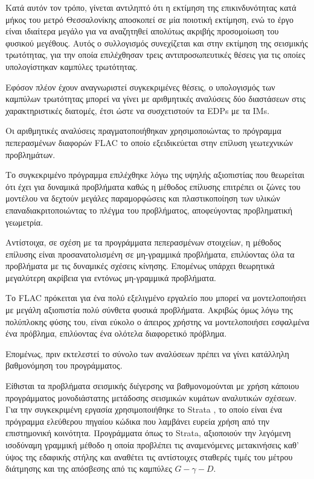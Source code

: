 
Κατά αυτόν τον τρόπο, γίνεται αντιληπτό ότι η εκτίμηση της επικινδυνότητας κατά μήκος του μετρό Θεσσαλονίκης αποσκοπεί σε μία ποιοτική εκτίμηση, ενώ το έργο είναι ιδιαίτερα μεγάλο για να αναζητηθεί απολύτως ακριβής προσομοίωση του φυσικού μεγέθους. Αυτός ο συλλογισμός συνεχίζεται και στην εκτίμηση της σεισμικής τρωτότητας, για την οποία επιλέχθησαν τρεις αντιπροσωπευτικές θέσεις για τις οποίες υπολογίστηκαν καμπύλες τρωτότητας.

Εφόσον πλέον έχουν αναγνωριστεί συγκεκριμένες θέσεις, ο υπολογισμός των καμπύλων τρωτότητας μπορεί να γίνει με αριθμητικές αναλύσεις δύο διαστάσεων στις χαρακτηριστικές διατομές, έτσι ώστε να συσχετιστούν τα EDPs με τα IMs.

Οι αριθμητικές αναλύσεις πραγματοποιήθηκαν χρησιμοποιώντας το πρόγραμμα πεπερασμένων διαφορών FLAC \parencite{FLAC} το οποίο εξειδικεύεται στην επίλυση γεωτεχνικών προβλημάτων.

Το συγκεκριμένο πρόγραμμα επιλέχθηκε λόγω της υψηλής αξιοπιστίας που θεωρείται ότι έχει για δυναμικά προβλήματα καθώς η μέθοδος επίλυσης επιτρέπει οι ζώνες του μοντέλου να δεχτούν μεγάλες παραμορφώσεις και πλαστικοποίηση των υλικών επαναδιακριτοποιώντας το πλέγμα του προβλήματος, αποφεύγοντας προβληματική γεωμετρία.

Αντίστοιχα, σε σχέση με τα προγράμματα πεπερασμένων στοιχείων, η μέθοδος επίλυσης είναι προσανατολισμένη σε μη-γραμμικά προβλήματα, επιλύοντας όλα τα προβλήματα με τις δυναμικές σχέσεις κίνησης. Επομένως υπάρχει θεωρητικά μεγαλύτερη ακρίβεια για εντόνως μη-γραμμικά προβλήματα.

Το FLAC πρόκειται για ένα πολύ εξελιγμένο εργαλείο που μπορεί να μοντελοποιήσει με μεγάλη αξιοπιστία πολύ σύνθετα φυσικά προβλήματα. Ακριβώς όμως λόγω της πολύπλοκης φύσης του, είναι εύκολο ο άπειρος χρήστης να μοντελοποιήσει εσφαλμένα ένα πρόβλημα, επιλύοντας ένα ολότελα διαφορετικό πρόβλημα.

Επομένως, πριν εκτελεστεί το σύνολο των αναλύσεων πρέπει να γίνει κατάλληλη βαθμονόμηση του προγράμματος.

Είθισται τα προβλήματα σεισμικής διέγερσης να βαθμονομούνται με χρήση κάποιου προγράμματος μονοδιάστατης μετάδοσης σεισμικών κυμάτων αναλυτικών σχέσεων. Για την συγκεκριμένη εργασία χρησιμοποιήθηκε το Strata \parencite{Strata}, το οποίο είναι ένα πρόγραμμα ελεύθερου πηγαίου κώδικα που λαμβάνει ευρεία χρήση από την επιστημονική κοινότητα. Προγράμματα όπως το Strata, αξιοποιούν την λεγόμενη ισοδύναμη γραμμική μέθοδο η οποία προβλέπει τις αναμενόμενες μετακινήσεις καθ' ύψος της εδαφικής στήλης και αναθέτει τις αντίστοιχες σταθερές τιμές του μέτρου διάτμησης και της απόσβεσης από τις καμπύλες $G-\gamma-D$.

